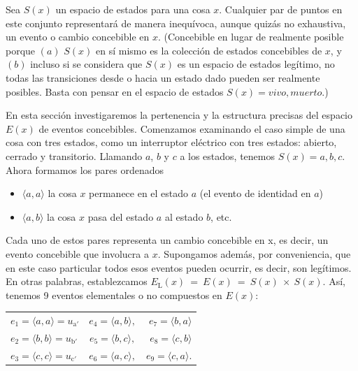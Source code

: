 \begin{justifying}
	\noindent Sea $S(x)$ un espacio de estados para una cosa $x$. Cualquier par de puntos en este conjunto
	representará de manera inequívoca, aunque quizás no exhaustiva, un evento
	o cambio concebible en $x$. (Concebible en lugar de realmente posible
	porque $(a)$ $S(x)$ en sí mismo es la colección de estados concebibles de $x$, y $(b)$
	incluso si se considera que $S(x)$ es un espacio de estados legítimo, no todas las transiciones
	desde o hacia un estado dado pueden ser realmente posibles. Basta con pensar en el espacio de estados
	$S(x) = {vivo, muerto}$.)

	En esta sección investigaremos la pertenencia y la estructura precisas
	del espacio $E(x)$ de eventos concebibles. Comenzamos examinando
	el caso simple de una cosa con tres estados, como un interruptor eléctrico con tres
	estados: abierto, cerrado y transitorio. Llamando $a$, $b$ y $c$ a los estados, tenemos
	$S(x) = {a, b, c}$. Ahora formamos los pares ordenados

	\begin{itemize}[itemsep=0pt, parsep=0pt]
		\item [ ] $\langle a, a \rangle $ la cosa $x$ permanece en el estado $a$ (el evento de identidad en $a$)
		\item [ ] $\langle a, b \rangle$ la cosa $x$ pasa del estado $a$ al estado $b$, etc.
	\end{itemize}

	Cada uno de estos pares representa un cambio concebible en x, es decir, un
	evento concebible que involucra a $x$. Supongamos además, por conveniencia,
	que en este caso particular todos esos eventos pueden ocurrir, es decir, son
	legítimos. En otras palabras, establezcamos $E_\mathrm{L}(x) \: = \: E(x) \: = \: S(x) \: \times \: S(x)$. Así, tenemos 9
	eventos elementales o no compuestos en $E(x)$:
	
	\begin{center}
		\begin{tabular}{l c r}
			$e_\mathrm{1} = \langle a, a \rangle =u_\mathrm{a'}$ & $e_\mathrm{4} = \langle a, b \rangle,$ & $e_\mathrm{7} = \langle b, a \rangle$ \\
			$e_\mathrm{2} = \langle b, b \rangle = u_\mathrm{b'}$ & $e_\mathrm{5} = \langle b, c \rangle,$ & $e_\mathrm{8} = \langle c, b \rangle$ \\
			$e_\mathrm{3} = \langle c, c \rangle = u_\mathrm{c'}$ & $e_\mathrm{6} = \langle a, c \rangle,$ & $e_\mathrm{9} = \langle c, a \rangle.$
		\end{tabular}
	\end{center}


\end{justifying}
